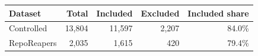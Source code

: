   \renewcommand{\theHreporttablerow}{rq6_filtering_comparison.\arabic{reporttablerow}}
  \setcounter{reporttablerow}{0}
  \begin{tabular}{lrrrr}
  \toprule
  Dataset & Total & Included & Excluded & Included share \\
  \midrule
  {reporttablerow}\label{tabrow:rq6_filtering_comparison:controlled}Controlled & 13,804 & 11,597 & 2,207 & 84.0\% \\
  {reporttablerow}\label{tabrow:rq6_filtering_comparison:realworld}RepoReapers & 2,035 & 1,615 & 420 & 79.4\% \\
  \bottomrule
  \end{tabular}
